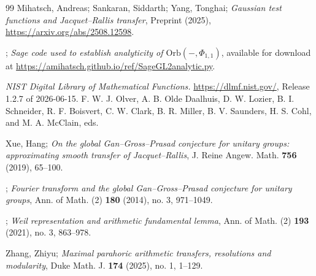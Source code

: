 \documentclass[reqno, 11pt]{amsart} %
\numberwithin{equation}{section}
\theoremstyle{plain}
\theoremstyle{definition}
\theoremstyle{remark}
\newcommand{\Orb}{\mathrm{Orb}}
\begin{document}
\begin{thebibliography}{99}
Mihatsch, Andreas; Sankaran, Siddarth; Yang, Tonghai; \emph{Gaussian test functions and Jacquet--Rallis transfer}, Preprint (2025), \href{https://arxiv.org/abs/2508.12598}{https://arxiv.org/abs/2508.12598}.

\bysame; \emph{Sage code used to establish analyticity of $\Orb(-,Φ_{1,1})$}, available for download at \href{https://amihatsch.github.io/ref/SageGL2analytic.py}{https://amihatsch.github.io/ref/SageGL2analytic.py}.


 \emph{NIST Digital Library of Mathematical Functions.} \href{https://dlmf.nist.gov/}{https://dlmf.nist.gov/}, Release 1.2.7 of 2026-06-15. F. W. J. Olver, A. B. Olde Daalhuis, D. W. Lozier, B. I. Schneider, R. F. Boisvert, C. W. Clark, B. R. Miller, B. V. Saunders, H. S. Cohl, and M. A. McClain, eds.

%

Xue, Hang; \emph{On the global Gan--Gross--Prasad conjecture for unitary groups: approximating smooth transfer of Jacquet--Rallis}, J. Reine Angew. Math. \textbf{756} (2019), 65--100.

%

\bysame; \emph{Fourier transform and the global Gan--Gross--Prasad conjecture for unitary groups}, Ann. of Math. (2) \textbf{180} (2014), no. 3, 971--1049.

\bysame; \emph{Weil representation and arithmetic fundamental lemma}, Ann. of Math. (2) \textbf{193} (2021), no. 3, 863--978.

Zhang, Zhiyu; \emph{Maximal parahoric arithmetic transfers, resolutions and modularity}, Duke Math. J. \textbf{174} (2025), no. 1, 1--129.
\end{thebibliography}
\end{document}
